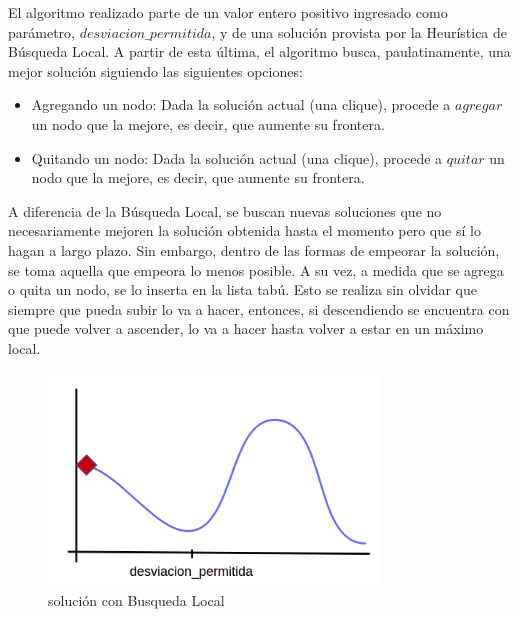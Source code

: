  El algoritmo realizado parte de un valor entero positivo ingresado como parámetro, $desviacion\_permitida$, y de una solución provista por la Heurística de Búsqueda Local. A partir de esta última, el algoritmo busca, paulatinamente, una mejor solución siguiendo las siguientes opciones:
\begin{itemize}
 \item Agregando un nodo: Dada la solución actual (una clique), procede a $agregar$ un nodo que la mejore, es decir, que aumente su frontera.
 \item Quitando un nodo: Dada la solución actual (una clique), procede a $quitar$ un nodo que la mejore, es decir, que aumente su frontera.
\end{itemize}
A diferencia de la Búsqueda Local, se buscan nuevas soluciones que no necesariamente mejoren la solución obtenida hasta el momento pero que sí lo hagan a largo plazo. Sin embargo, dentro de las formas de empeorar la solución, se toma aquella que empeora lo menos posible. A su vez, a medida que se agrega o quita un nodo, se lo inserta en la lista tabú. Esto se realiza sin olvidar que siempre que pueda subir lo va a hacer, entonces, si descendiendo se encuentra con que puede volver a ascender, lo va a hacer hasta volver a estar en un máximo local.\newline

\begin{figure}[H] %
\begin{center}
\includegraphics[width=250pt]{../imgs/1_tabu.png}
\caption{solución con Busqueda Local}
\end{center}
\end{figure}


